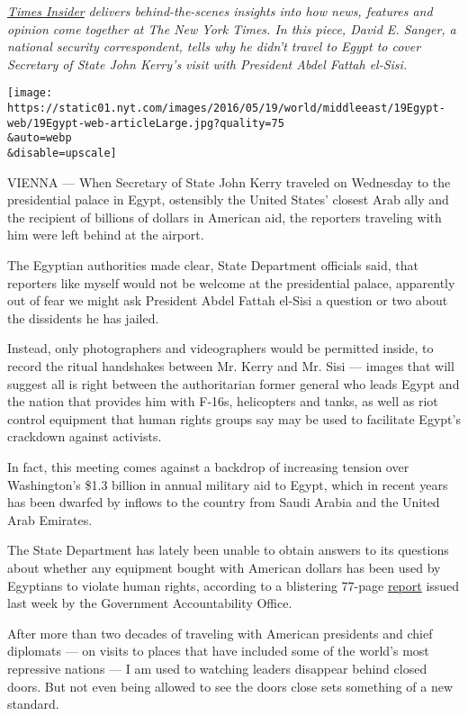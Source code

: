 \href{http://www.nytimes.com/section/insider}{\emph{Times Insider}}
\emph{delivers behind-the-scenes insights into how news, features and
opinion come together at The New York Times. In this piece, David E.
Sanger, a national security correspondent, tells why he didn't travel to
Egypt to cover Secretary of State John Kerry's visit with President
Abdel Fattah el-Sisi.}

\texttt{[image: https://static01.nyt.com/images/2016/05/19/world/middleeast/19Egypt-web/19Egypt-web-articleLarge.jpg?quality=75\\\&auto=webp\\\&disable=upscale]}

VIENNA --- When Secretary of State John Kerry traveled on Wednesday to
the presidential palace in Egypt, ostensibly the United States' closest
Arab ally and the recipient of billions of dollars in American aid, the
reporters traveling with him were left behind at the airport.

The Egyptian authorities made clear, State Department officials said,
that reporters like myself would not be welcome at the presidential
palace, apparently out of fear we might ask President Abdel Fattah
el-Sisi a question or two about the dissidents he has jailed.

Instead, only photographers and videographers would be permitted inside,
to record the ritual handshakes between Mr. Kerry and Mr. Sisi ---
images that will suggest all is right between the authoritarian former
general who leads Egypt and the nation that provides him with F-16s,
helicopters and tanks, as well as riot control equipment that human
rights groups say may be used to facilitate Egypt's crackdown against
activists.

In fact, this meeting comes against a backdrop of increasing tension
over Washington's \$1.3 billion in annual military aid to Egypt, which
in recent years has been dwarfed by inflows to the country from Saudi
Arabia and the United Arab Emirates.

The State Department has lately been unable to obtain answers to its
questions about whether any equipment bought with American dollars has
been used by Egyptians to violate human rights, according to a
blistering 77-page \href{http://www.gao.gov/products/GAO-16-435}{report}
issued last week by the Government Accountability Office.

After more than two decades of traveling with American presidents and
chief diplomats --- on visits to places that have included some of the
world's most repressive nations --- I am used to watching leaders
disappear behind closed doors. But not even being allowed to see the
doors close sets something of a new standard.

